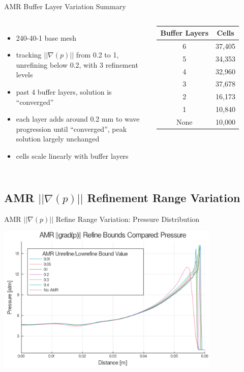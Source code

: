 \begin{frame}{AMR Buffer Layer Variation Summary}
\begin{columns}
\begin{itemize}
\item 240-40-1 base mesh
\item tracking $||\nabla (p)||$ from 0.2 to 1, unrefining below 0.2, with 3 refinement levels
\item past 4 buffer layers, solution is ``converged''
\item each layer adds around 0.2 mm to wave progression until ``converged'', peak solution largely unchanged
\item cells scale linearly with buffer layers
\end{itemize}
\begin{table}[h]
\centering
\begin{tabular}{cc}
Buffer Layers & Cells \\ \hline
6 & 37,405 \\ 
5 & 34,353 \\
4 & 32,960 \\
3 & 37,678 \\
2 & 16,173 \\
1 & 10,840 \\
None & 10,000 \\
\end{tabular}
\end{table}
\end{columns}
\end{frame}

\subsection{AMR $|| \nabla (p)||$ Refinement Range Variation}

\begin{frame}{AMR $|| \nabla (p)||$ Refine Range Variation: Pressure Distribution}
\begin{center}
\includegraphics[width=0.8\textwidth]{../figs/amrfigs/amr_refinebounds/p.png}
\end{center}
\end{frame}

